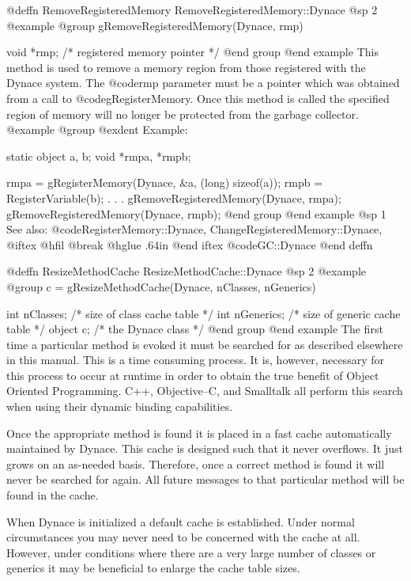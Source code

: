 @deffn {RemoveRegisteredMemory} RemoveRegisteredMemory::Dynace
@sp 2
@example
@group
gRemoveRegisteredMemory(Dynace, rmp)

void    *rmp;   /*  registered memory pointer  */
@end group
@end example
This method is used to remove a memory region from those registered
with the Dynace system.  The @code{rmp} parameter must be a pointer
which was obtained from a call to @code{gRegisterMemory}.  Once
this method is called the specified region of memory will no longer
be protected from the garbage collector.
@example
@group
@exdent Example:

static  object  a, b;
void    *rmpa, *rmpb;

rmpa = gRegisterMemory(Dynace, &a, (long) sizeof(a));
rmpb = RegisterVariable(b);
   .
   .
   .
gRemoveRegisteredMemory(Dynace, rmpa);
gRemoveRegisteredMemory(Dynace, rmpb);
@end group
@end example
@sp 1
See also:  @code{RegisterMemory::Dynace, ChangeRegisteredMemory::Dynace,}
@iftex
@hfil @break @hglue .64in   
@end iftex
@code{GC::Dynace}
@end deffn








@deffn {ResizeMethodCache} ResizeMethodCache::Dynace
@sp 2
@example
@group
c = gResizeMethodCache(Dynace, nClasses, nGenerics)

int     nClasses;       /*  size of class cache table */
int     nGenerics;      /*  size of generic cache table */
object  c;              /*  the Dynace class  */
@end group
@end example
The first time a particular method is evoked it must be searched for
as described elsewhere in this manual.  This is a time consuming
process.  It is, however, necessary for this process to occur at runtime
in order to obtain the true benefit of Object Oriented Programming.
C++, Objective--C, and Smalltalk all perform this search when using their
dynamic binding capabilities.

Once the appropriate method is found it is placed in a fast cache
automatically maintained by Dynace.  This cache is designed such that
it never overflows.  It just grows on an as-needed basis.  Therefore,
once a correct method is found it will never be searched for again.
All future messages to that particular method will be found in the
cache.

When Dynace is initialized a default cache is established.  Under normal
circumstances you may never need to be concerned with the cache at
all.  However, under conditions where there are a very large number
of classes or generics it may be beneficial to enlarge the cache
table sizes.


